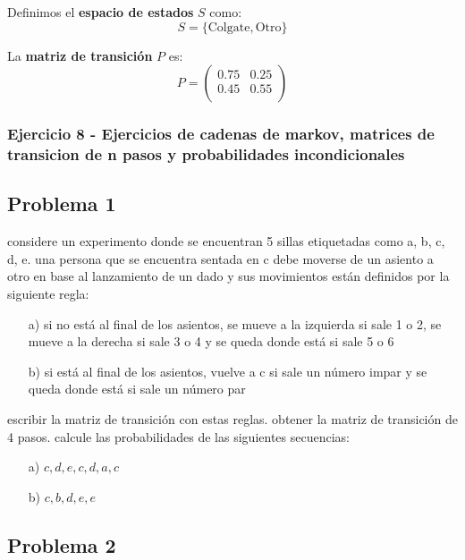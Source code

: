 \documentclass{article}
\begin{document}
Definimos el \textbf{espacio de estados} \( S \) como:
\[ S = \{ \text{Colgate}, \text{Otro} \} \]

La \textbf{matriz de transición} \( P \) es:
\[
    P = \begin{pmatrix}
        0.75 & 0.25 \\
        0.45 & 0.55 \\
    \end{pmatrix}
\]

\subsubsection{Ejercicio 8 - Ejercicios de cadenas de markov, matrices de transicion  de n pasos y probabilidades incondicionales}

\subsection*{Problema 1}

considere un experimento donde se encuentran 5 sillas etiquetadas como a, b, c, d, e. una persona que se encuentra sentada en c debe moverse de un asiento a otro en base al lanzamiento de un dado y sus movimientos están definidos por la siguiente regla:

\begin{itemize}
    \item[a)] si no está al final de los asientos, se mueve a la izquierda si sale 1 o 2, se mueve a la derecha si sale 3 o 4 y se queda donde está si sale 5 o 6
    \item[b)] si está al final de los asientos, vuelve a c si sale un número impar y se queda donde está si sale un número par
\end{itemize}

escribir la matriz de transición con estas reglas. obtener la matriz de transición de 4 pasos. calcule las probabilidades de las siguientes secuencias:

\begin{enumerate}
    \item[a)] \( c, d, e, c, d, a, c \)
    \item[b)] \( c, b, d, e, e \)
\end{enumerate}

\subsection*{Problema 2}
\end{document}
